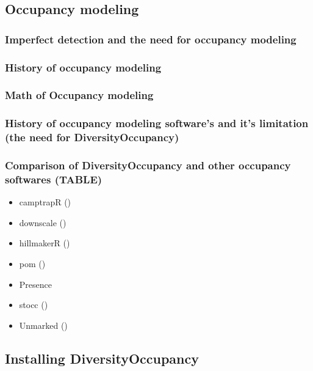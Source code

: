 \documentclass[article]{jss}
\providecommand{\tightlist}{%
  \setlength{\itemsep}{0pt}\setlength{\parskip}{0pt}}
\begin{document}
\subsection{Occupancy modeling}\label{occupancy-modeling}

\subsubsection{Imperfect detection and the need for occupancy
modeling}\label{imperfect-detection-and-the-need-for-occupancy-modeling}

\subsubsection{History of occupancy
modeling}\label{history-of-occupancy-modeling}

\subsubsection{Math of Occupancy
modeling}\label{math-of-occupancy-modeling}

\subsubsection{History of occupancy modeling software's and it's
limitation (the need for
DiversityOccupancy)}\label{history-of-occupancy-modeling-softwares-and-its-limitation-the-need-for-diversityoccupancy}

\subsubsection{Comparison of DiversityOccupancy and other occupancy
softwares
(TABLE)}\label{comparison-of-diversityoccupancy-and-other-occupancy-softwares-table}

\begin{itemize}
\tightlist
\item
  camptrapR ()
\item
  downscale ()
\item
  hillmakerR ()
\item
  pom ()
\item
  Presence
\item
  stocc ()
\item
  Unmarked ()
\end{itemize}

\subsection{Installing
DiversityOccupancy}\label{installing-diversityoccupancy}
\end{document}
